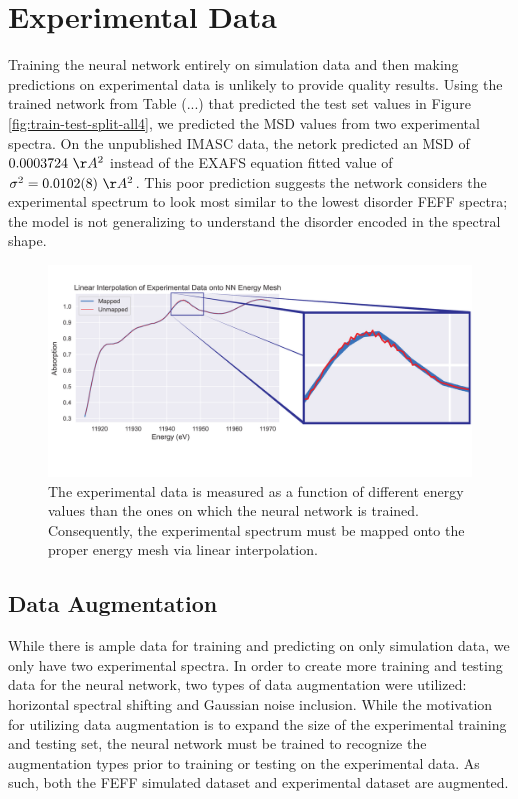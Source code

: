 \section{Experimental Data} \label{ch:results}
Training the neural network entirely on simulation data and then making predictions on experimental data is unlikely to provide quality results. Using the trained network from Table (...) that predicted the test set values in Figure \ref{fig:train-test-split-all4}, we predicted the MSD values from two experimental spectra. On the unpublished IMASC data, the netork predicted an MSD of $0.0003724~\AA^2$ instead of the EXAFS equation fitted value of ${\sigma^2=0.0102(8)~\AA^2}$. This poor prediction suggests the network considers the experimental spectrum to look most similar to the lowest disorder FEFF spectra; the model is not generalizing to understand the disorder encoded in the spectral shape.


\begin{figure}
    \centering
    \includegraphics[width=\linewidth]{Chapters/Figures/quality-of-interpolation-skinny.pdf}
    \caption[Experimental Data Interpolation]{The experimental data is measured as a function of different energy values than the ones on which the neural network is trained. Consequently, the experimental spectrum must be mapped onto the proper energy mesh via linear interpolation.}
    \label{fig:interpolation-skinny}
\end{figure}

\subsection{Data Augmentation}
While there is ample data for training and predicting on only simulation data, we only have two experimental spectra. In order to create more training and testing data for the neural network, two types of data augmentation were utilized: horizontal spectral shifting and Gaussian noise inclusion. While the motivation for utilizing data augmentation is to expand the size of the experimental training and testing set, the neural network must be trained to recognize the augmentation types prior to training or testing on the experimental data. As such, both the FEFF simulated dataset and experimental dataset are augmented.

